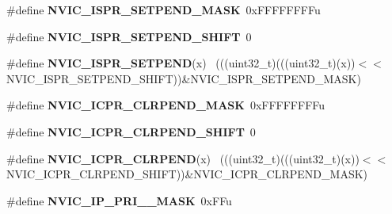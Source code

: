 \begin{DoxyCompactItemize}
\item 
\hypertarget{group___n_v_i_c___register___masks_ga0dfd5e3a045907297c9dd71464796792}{}\#define {\bfseries N\+V\+I\+C\+\_\+\+I\+S\+P\+R\+\_\+\+S\+E\+T\+P\+E\+N\+D\+\_\+\+M\+A\+S\+K}~0x\+F\+F\+F\+F\+F\+F\+F\+Fu\label{group___n_v_i_c___register___masks_ga0dfd5e3a045907297c9dd71464796792}

\item 
\hypertarget{group___n_v_i_c___register___masks_ga67398055aa260b7d62bdcb6c7e1aa202}{}\#define {\bfseries N\+V\+I\+C\+\_\+\+I\+S\+P\+R\+\_\+\+S\+E\+T\+P\+E\+N\+D\+\_\+\+S\+H\+I\+F\+T}~0\label{group___n_v_i_c___register___masks_ga67398055aa260b7d62bdcb6c7e1aa202}

\item 
\hypertarget{group___n_v_i_c___register___masks_ga482c043a170912b0f33d89a75f340fdc}{}\#define {\bfseries N\+V\+I\+C\+\_\+\+I\+S\+P\+R\+\_\+\+S\+E\+T\+P\+E\+N\+D}(x)                                      ~(((uint32\+\_\+t)(((uint32\+\_\+t)(x))$<$$<$N\+V\+I\+C\+\_\+\+I\+S\+P\+R\+\_\+\+S\+E\+T\+P\+E\+N\+D\+\_\+\+S\+H\+I\+F\+T))\&N\+V\+I\+C\+\_\+\+I\+S\+P\+R\+\_\+\+S\+E\+T\+P\+E\+N\+D\+\_\+\+M\+A\+S\+K)\label{group___n_v_i_c___register___masks_ga482c043a170912b0f33d89a75f340fdc}

\item 
\hypertarget{group___n_v_i_c___register___masks_ga16ce69a282193dc237cb2a889a314ad2}{}\#define {\bfseries N\+V\+I\+C\+\_\+\+I\+C\+P\+R\+\_\+\+C\+L\+R\+P\+E\+N\+D\+\_\+\+M\+A\+S\+K}~0x\+F\+F\+F\+F\+F\+F\+F\+Fu\label{group___n_v_i_c___register___masks_ga16ce69a282193dc237cb2a889a314ad2}

\item 
\hypertarget{group___n_v_i_c___register___masks_ga6391b14d641916849bb245233f7689c2}{}\#define {\bfseries N\+V\+I\+C\+\_\+\+I\+C\+P\+R\+\_\+\+C\+L\+R\+P\+E\+N\+D\+\_\+\+S\+H\+I\+F\+T}~0\label{group___n_v_i_c___register___masks_ga6391b14d641916849bb245233f7689c2}

\item 
\hypertarget{group___n_v_i_c___register___masks_ga2bb3c4fb6a79c518df75a22d9cb1b256}{}\#define {\bfseries N\+V\+I\+C\+\_\+\+I\+C\+P\+R\+\_\+\+C\+L\+R\+P\+E\+N\+D}(x)                                      ~(((uint32\+\_\+t)(((uint32\+\_\+t)(x))$<$$<$N\+V\+I\+C\+\_\+\+I\+C\+P\+R\+\_\+\+C\+L\+R\+P\+E\+N\+D\+\_\+\+S\+H\+I\+F\+T))\&N\+V\+I\+C\+\_\+\+I\+C\+P\+R\+\_\+\+C\+L\+R\+P\+E\+N\+D\+\_\+\+M\+A\+S\+K)\label{group___n_v_i_c___register___masks_ga2bb3c4fb6a79c518df75a22d9cb1b256}

\item 
\hypertarget{group___n_v_i_c___register___masks_ga6cee347aa0bb97ccc21803927e8d30eb}{}\#define {\bfseries N\+V\+I\+C\+\_\+\+I\+P\+\_\+\+P\+R\+I\+\_\+\_\+\+M\+A\+S\+K}~0x\+F\+Fu\label{group___n_v_i_c___register___masks_ga6cee347aa0bb97ccc21803927e8d30eb}


\end{DoxyCompactItemize}
